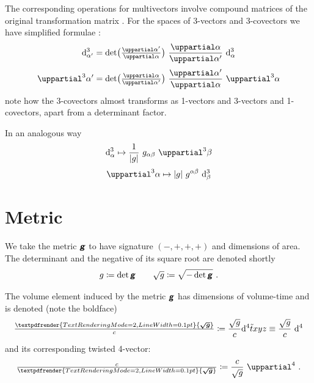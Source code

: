 \documentclass[\ifafour a4paper,12pt,\else a5paper,10pt,\fi%
onecolumn,oneside,article,%
british%
]{memoir}
\theoremstyle{remark}
\theoremstyle{innote}
\newcommand*{\mathte}[1]{\textbf{\textit{\textsf{#1}}}}
\renewcommand*{\bm}[1]{\textpdfrender{TextRenderingMode=2,LineWidth=0.1pt}{\boldsymbol{#1}}}
\newcommand*{\de}{\uppartial}%
\newcommand*{\di}{\mathrm{d}}%
\newcommand*{\defd}{\coloneqq}
\DeclarePairedDelimiter\abs{\lvert}{\rvert}
\renewcommand*{\|}[1][]{\nonscript\:#1\vert\nonscript\:\mathopen{}}
\newcommand*{\sect}{\S}%
\newcommand*{\eqn}{eq.}%
\newcommand*{\ssssi}[1]{\di^{4}{#1}}
\newcommand*{\tw}[1]{\tilde{#1}}
\newcommand*{\ttte}[1]{\de^{3}{#1}}
\newcommand*{\tttte}[1]{\de^{4}{#1}}
\newcommand*{\ttti}[1]{\di^{3}_{#1}}
\newcommand*{\tttti}[1]{\di^{4}_{#1}}
\newcommand*{\yg}{\mathte{g}}
\newcommand*{\dg}{\sqrt{g}}
\newcommand*{\ve}{\tfrac{\bm{\sqrt{g}}}{c}}
\newcommand*{\vi}{\tfrac{c}{\bm{\sqrt{g}}}}
\begin{document}
The corresponding operations for multivectors involve {compound matrices} of the original transformation matrix \autocites[\sect~IV.A.1 p.~199]{choquetbruhatetal1977_r1996}. For the spaces of 3-vectors and 3-covectors we have simplified formulae \autocites[\sect~I.4 \eqn~(33)]{gantmacher1959_r2000}:
\begin{equation}
  \label{eq:transf3_simple}
  \begin{gathered}
    \ttti{\alpha'} =
    \det\bigl(
    \tfrac{\de \alpha'}{\de \alpha}
    \bigr)
    \ 
    \frac{\de \alpha}{\de \alpha'}
    \ 
    \ttti{\alpha}
    \\[\jot]
    \ttte{\alpha'} =
    \det\bigl(
    \tfrac{\de \alpha}{\de \alpha'}
    \bigr)
    \ 
    \frac{\de \alpha'}{\de \alpha}
    \ 
    \ttte{\alpha}
  \end{gathered}
\end{equation}
note how the 3-covectors almost transforms as 1-vectors and 3-vectors and 1-covectors, apart from a determinant factor.

In an analogous way
\begin{equation}
  \label{eq:raise3_simple}
  \begin{gathered}
    \ttti{\alpha}
    \mapsto
\frac{1}{\abs{g}}\ g_{\alpha\beta}\
    \ttte{\beta}
    \\[\jot]
    \ttte{\alpha}
    \mapsto
\abs{g}\ g^{\alpha\beta}\
    \ttti{\beta}
  \end{gathered}
\end{equation}


\section{Metric}
\label{sec:metric}

We take the metric $\yg$ to have signature $(-,+,+,+)$ and dimensions of area. The determinant and the negative of its square root are denoted shortly
\begin{equation}
  \label{eq:det_g}
  g\defd \det\yg
  \qquad
\dg \defd \sqrt{-\det\yg} \ .
\end{equation}

The volume element induced by the metric $\yg$ has dimensions of volume-time and is denoted (note the boldface)
\begin{equation}
  \label{eq:vol_element}
  \ve \defd \frac{\dg}{c} \ssssi{\tw{t}xyz} \equiv \frac{\dg}{c}\ \tttti{}
\end{equation}
and its corresponding twisted 4-vector:
\begin{equation}
  \label{eq:inv_vol_element}
  \vi \defd \frac{c}{\dg}\ \tttte{} \ .
\end{equation}
\end{document}
